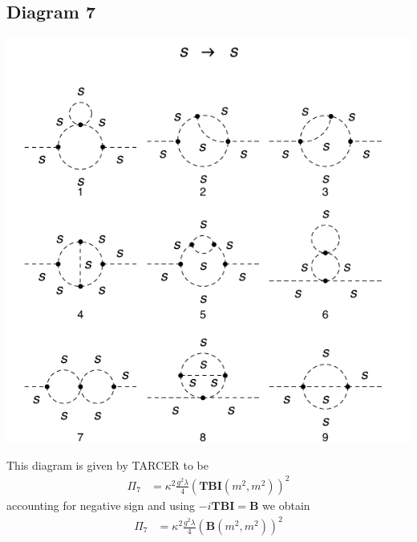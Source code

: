 \documentclass[11pt]{article}
\begin{document}
\subsection*{Diagram 7}
\begin{center}
\includegraphics{2loop_7.pdf}
\end{center}
This diagram is given by TARCER to be
\begin{align}
\Pi_7 & =  \kappa^2 \frac{g^2 \lambda}{4 } \left(\mathbf{TBI}(m^2,m^2)\right)^2
\end{align}
accounting for negative sign and using $-i\mathbf{TBI} = \mathbf{B}$ we obtain
\begin{align}
\Pi_7 & = \kappa^2 \frac{g^2 \lambda}{4 } \left(\mathbf{B}(m^2,m^2)\right)^2
\end{align}
\end{document}
